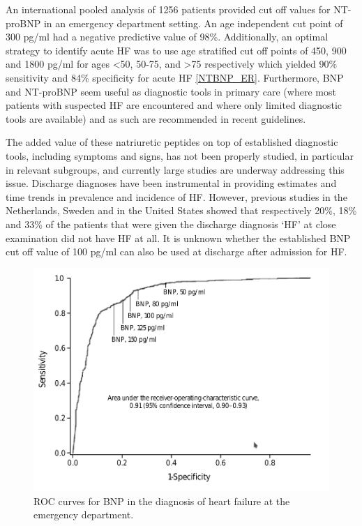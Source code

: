 \documentclass[14pt,a4paper,onecolumn]{extarticle}
\begin{document}
 An international pooled analysis of 1256 patients provided cut off values for NT-proBNP in an emergency department setting. An age independent cut point of 300 pg/ml had a negative predictive value of 98\%.  Additionally, an optimal strategy to identify acute HF was to use age stratified cut off points of 450, 900 and 1800 pg/ml for ages <50, 50-75, and >75 respectively which yielded 90\% sensitivity and 84\% specificity for acute HF \ref{NTBNP_ER}. \citep{Januzzi2006,Januzzi2005} Furthermore, BNP and NT-proBNP seem useful as diagnostic tools in primary care (where most patients with suspected HF are encountered and where only limited diagnostic tools are available) and as such are recommended in recent guidelines. \citep{Swedberg2005}

 The added value of these natriuretic peptides on top of established diagnostic tools, including symptoms and signs, has not been properly studied, in particular in relevant subgroups, and currently large studies are underway addressing this issue.  %
  Discharge diagnoses have been instrumental in providing estimates and time trends in prevalence and incidence of HF. However, previous studies in the Netherlands, Sweden and in the United States showed that respectively 20\%, 18\% and 33\% of the patients that were given the discharge diagnosis ‘HF’ at close examination did not have HF at all. \citep{Heerdink1995,Ingelsson2005,Goff2000} It is unknown whether the established BNP cut off value of 100 pg/ml can also be used at discharge after admission for HF.

\begin{figure}
    \centering
    \includegraphics[scale=0.4]{./images/BNP_ER.png}
    \caption{ROC curves for BNP in the diagnosis of heart failure at the emergency department.}
    \label{BNP_ER}
\end{figure}
\end{document}
